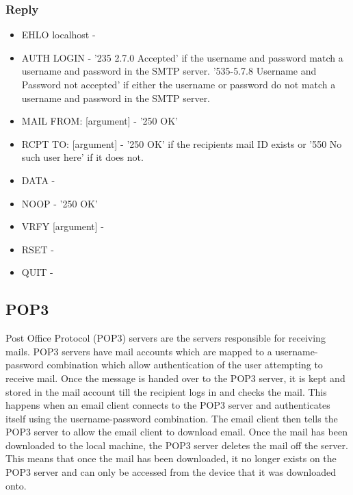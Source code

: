 \documentclass[11pt]{article}
\begin{document}
\begin{multicols}{2}
\subsubsection{Reply}
\begin{itemize}
  \item EHLO localhost - 
  \item AUTH LOGIN - '235 2.7.0 Accepted' if the username and password match a username and password in the SMTP server. '535-5.7.8 Username and Password not accepted' if either the username or password do not match a username and password in the SMTP server.
  \item MAIL FROM: [argument] - '250 OK'
  \item RCPT TO: [argument] - '250 OK' if the recipients mail ID exists or '550 No such user here' if it does not.
  \item DATA - 
  \item NOOP - '250 OK'
  \item VRFY [argument] - 
  \item RSET - 
  \item QUIT - 
\end{itemize}
\subsection{POP3}
Post Office Protocol (POP3) servers are the servers responsible for receiving mails. POP3 servers have mail accounts which are mapped to a username-password combination which allow authentication of the user attempting to receive mail. Once the message is handed over to the POP3 server, it is kept and stored in the mail account till the recipient logs in and checks the mail. This happens when an email client connects to the POP3 server and authenticates itself using the username-password combination. The email client then tells the POP3 server to allow the email client to download email. Once the mail has been downloaded to the local machine, the POP3 server deletes the mail off the server. This means that once the mail has been downloaded, it no longer exists on the POP3 server and can only be accessed from the device that it was downloaded onto.


\end{multicols}
\end{document}
